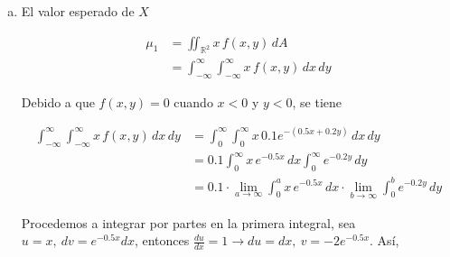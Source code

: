 \documentclass[12pt]{exam}
\begin{document}
\begin{questions}
\begin{enumerate}[a)]
    \begin{enumerate}[c.a)]
    \item El valor esperado de $X$

      \begin{align*}
        \mu_1
        &= \iint_{\mathbb{R}^2}x\,f(x,y)\,dA \\
        &= \int_{-\infty}^{\infty} \int_{-\infty}^{\infty} x\,f(x,y)\,dx\,dy 
      \end{align*}

      Debido a que $f(x,y)=0$ cuando $x<0$ y $y<0$, se tiene

      \begin{align*}
        \int_{-\infty}^{\infty} \int_{-\infty}^{\infty} x\,f(x,y)\,dx\,dy 
        &= \int_0^{\infty} \int_0^{\infty} x\,0.1e^{-(0.5x+0.2y)}\,dx\,dy \\
        &= 0.1 \int_0^{\infty} x\,e^{-0.5x}\,dx \int_0^{\infty} e^{-0.2y}\,dy \\
        &= 0.1 \cdot \lim_{a\to \infty}\int_0^a x\,e^{-0.5x}\,dx \cdot \lim_{b\to \infty}\int_0^b e^{-0.2y}\,dy 
      \end{align*}

      Procedemos a integrar por partes en la primera integral, sea $u=x,~dv=e^{-0.5x}dx$, entonces $\frac{du}{dx}=1 \rightarrow du=dx,~v=-2e^{-0.5x}$. Así,


\end{enumerate}
\end{enumerate}
\end{questions}
\end{document}

